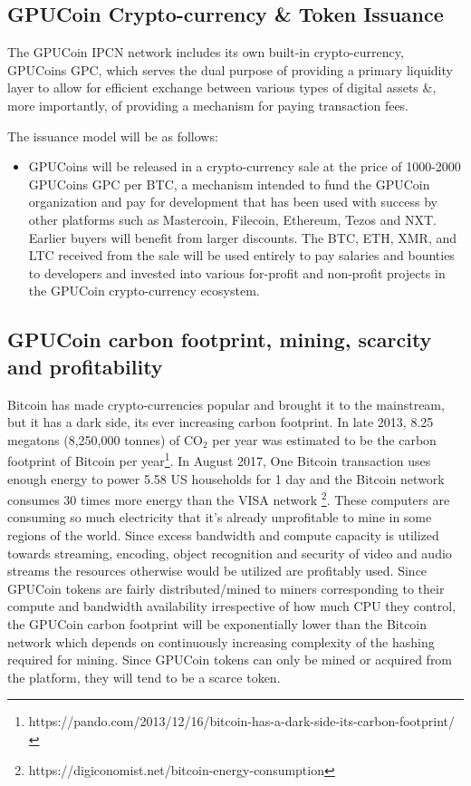\documentclass{article}
\begin{document}
\subsection{GPUCoin Crypto-currency \& Token Issuance}

The GPUCoin IPCN network includes its own built-in crypto-currency, GPUCoins GPC, which serves the dual purpose of providing a primary liquidity layer to allow for efficient exchange between various types of digital assets \&, more importantly, of providing a mechanism for paying transaction fees.

The issuance model will be as follows:

\begin{itemize}

\item GPUCoins will be released in a crypto-currency sale at the price of 1000-2000 GPUCoins GPC per BTC,
 a mechanism intended to fund the GPUCoin organization and pay for development that has been used with success by other platforms such as Mastercoin, Filecoin, Ethereum, Tezos and NXT.
Earlier buyers will benefit from larger discounts. The BTC, ETH, XMR, and LTC received from the sale will be used entirely to pay salaries and bounties to developers and invested into various for-profit and non-profit projects in the GPUCoin crypto-currency ecosystem.

\end{itemize}

\subsection{GPUCoin carbon footprint, mining, scarcity and profitability}
Bitcoin has made crypto-currencies popular and brought it to the mainstream, but it has a dark side, its ever increasing carbon footprint. In late 2013, 8.25 megatons (8,250,000 tonnes) of CO$_2$ per year was estimated to be the carbon footprint of Bitcoin per year\footnote{https://pando.com/2013/12/16/bitcoin-has-a-dark-side-its-carbon-footprint/}. In August 2017, One Bitcoin transaction uses enough energy to power 5.58 US households for 1 day and the Bitcoin network consumes 30 times more energy than the VISA network \footnote{https://digiconomist.net/bitcoin-energy-consumption}. These computers are consuming so much electricity that it’s already unprofitable to mine in some regions of the world. Since excess bandwidth and compute capacity is utilized towards streaming, encoding, object recognition and security of video and audio streams the resources otherwise would be utilized are profitably used. Since GPUCoin tokens are fairly distributed/mined to miners corresponding to their compute and bandwidth availability irrespective of how much CPU they control, the GPUCoin carbon footprint will be exponentially lower than the Bitcoin network which depends on continuously increasing complexity of the hashing required for mining. Since GPUCoin tokens can only be mined or acquired from the platform, they will tend to be a scarce token.
\end{document}
